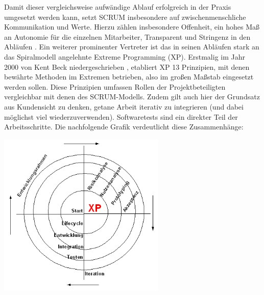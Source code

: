 Damit dieser vergleichsweise aufwändige Ablauf erfolgreich in der Praxis umgesetzt werden kann, setzt \gls{SCRUM} insbesondere auf zwischenmenschliche Kommunikation und Werte. Hierzu zählen insbesondere Offenheit, ein hohes Maß an Autonomie für die einzelnen Mitarbeiter, Transparent und Stringenz in den Abläufen \cite{SCRUM_values_nodate}.\newline
Ein weiterer prominenter Vertreter ist das in seinen Abläufen stark an das Spiralmodell angelehnte Extreme Programming (\acrshort{XP}). Erstmalig im Jahr 2000 von Kent Beck niedergeschrieben \cite{beck_extreme_2000}, etabliert \acrshort{XP} 13 Prinzipien, mit denen bewährte Methoden \glqq im Extremen\grqq{} betrieben, also im großen Maßstab eingesetzt werden sollen.
Diese Prinzipien umfassen Rollen der Projektbeteiligten vergleichbar mit denen des \gls{SCRUM}-Modells. Zudem gilt auch hier der Grundsatz aus Kundensicht zu denken, getane Arbeit iterativ zu integrieren (und dabei möglichst viel wiederzuverwenden). Softwaretests sind ein direkter Teil der Arbeitsschritte. Die nachfolgende Grafik verdeutlicht diese Zusammenhänge:

\begin{center}
    \includegraphics[width=0.6\textwidth]{Grafiken/XP-Life.png}
    \label{Grafik:Zyklen des Extreme Programmings}
\end{center}

